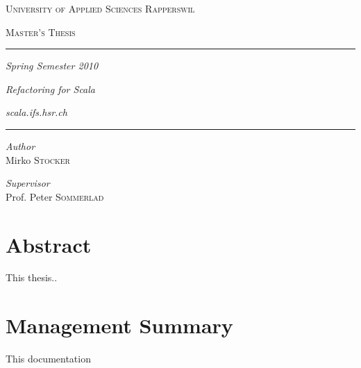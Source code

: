\begin{titlepage}
 
\begin{center}
 
\textsc{\Large University of Applied Sciences Rapperswil}
 
\textsc{Master's Thesis}

\rule{0.83\textwidth}{0.4pt}

\vspace{0.2cm}

\normalsize{\textit{Spring Semester 2010}}

\vspace*{\fill}
 
\Huge{\textit{Refactoring for Scala}}

\vspace*{\fill}
\vspace{\baselineskip}

\normalsize{\textit{scala.ifs.hsr.ch}}

\rule{0.83\textwidth}{0.4pt}
\vskip0.35cm
\begin{minipage}{0.4\textwidth}
\begin{flushleft} \large
\emph{Author}\\
Mirko \textsc{Stocker}
\end{flushleft}
\end{minipage}
\begin{minipage}{0.4\textwidth}
\begin{flushright} \large
\emph{Supervisor} \\
Prof. Peter \textsc{Sommerlad}
\end{flushright}
\end{minipage}
 
\end{center}
 
\end{titlepage}


\chapter*{Abstract}


This thesis..


\chapter*{Management Summary}

This documentation 

